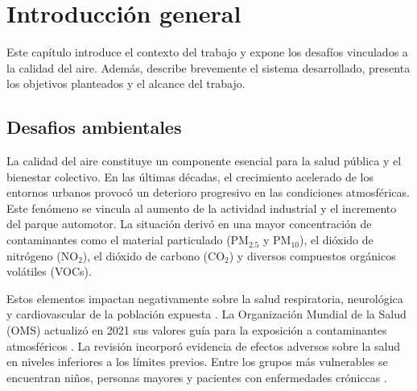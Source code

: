 
\chapter{Introducción general} %

\label{Chapter1} %
\label{IntroGeneral}

Este capítulo introduce el contexto del trabajo y expone los desafíos vinculados a la calidad del aire. Además, describe brevemente el sistema desarrollado, presenta los objetivos planteados y el alcance del trabajo.


\newcommand{\keyword}[1]{\textbf{#1}}
\newcommand{\tabhead}[1]{\textbf{#1}}
\newcommand{\code}[1]{\texttt{#1}}
\newcommand{\file}[1]{\texttt{\bfseries#1}}
\newcommand{\option}[1]{\texttt{\itshape#1}}
\newcommand{\grados}{$^{\circ}$}



\section{Desafios ambientales}

La calidad del aire constituye un componente esencial para la salud pública y el bienestar colectivo. En las últimas décadas, el crecimiento acelerado de los entornos urbanos provocó un deterioro progresivo en las condiciones atmosféricas. Este fenómeno se vincula al aumento de la actividad industrial y el incremento del parque automotor. La situación derivó en una mayor concentración de contaminantes como el material particulado (PM$_2.5$ y PM$_10$), el dióxido de nitrógeno (NO$_2$), el dióxido de carbono (CO$_2$) y diversos compuestos orgánicos volátiles (VOCs).

Estos elementos impactan negativamente sobre la salud respiratoria, neurológica y cardiovascular de la población expuesta \cite{WHO:2021}. La Organización Mundial de la Salud (OMS) actualizó en 2021 sus valores guía para la exposición a contaminantes atmosféricos \cite{WHO:2021}. La revisión incorporó evidencia de efectos adversos sobre la salud en niveles inferiores a los límites previos. Entre los grupos más vulnerables se encuentran niños, personas mayores y pacientes con enfermedades cróniccas \cite{WHO:2018}.

